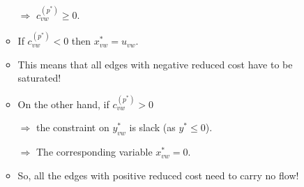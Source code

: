 \documentclass{article}
\begin{document}
\begin{itemize}
\begin{itemize}
$\Rightarrow$ $c_{vw}^{(p^*)}\ge 0$. 
\item If  $c_{vw}^{(p^*)}<0$ then $x_{vw}^*=u_{vw}$.

\item  This means that all edges with negative reduced cost have to be saturated!
\item On the other hand, if $c_{vw}^{(p^*)} > 0$

$\Rightarrow$ the constraint on $y_{vw}^*$ is slack (as $y^*\leq 0$). 

$\Rightarrow$ The corresponding variable $x_{vw}^*=0$. 
\item So, all the edges with positive reduced cost need to carry no flow!
\end{itemize}  
\end{itemize}

\end{document}
